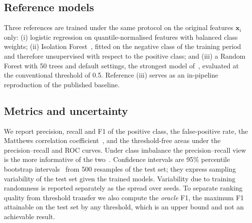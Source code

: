 \subsection{Reference models}\label{sec:method-baselines}
Three references are trained under the same protocol on the original features $\mathbf{x}_i$ only: (i) logistic regression on quantile-normalised features with balanced class weights; (ii) Isolation Forest~\cite{liu2008}, fitted on the negative class of the training period and therefore unsupervised with respect to the positive class; and (iii) a Random Forest with 50 trees and default settings, the strongest model of~\cite{elmougy2023}, evaluated at the conventional threshold of 0.5. Reference (iii) serves as an in-pipeline reproduction of the published baseline.

\subsection{Metrics and uncertainty}\label{sec:method-metrics}
We report precision, recall and F1 of the positive class, the false-positive rate, the Matthews correlation coefficient~\cite{chicco2020}, and the threshold-free areas under the precision--recall and ROC curves. Under class imbalance the precision--recall view is the more informative of the two~\cite{davis2006,saito2015}. Confidence intervals are 95\% percentile bootstrap intervals~\cite{efron1979} from 500 resamples of the test set; they express sampling variability of the test set given the trained models. Variability due to training randomness is reported separately as the spread over seeds. To separate ranking quality from threshold transfer we also compute the \emph{oracle} F1, the maximum F1 attainable on the test set by any threshold, which is an upper bound and not an achievable result.
